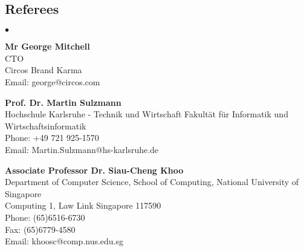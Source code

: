 \documentclass[margin,line]{res}
\newenvironment{list2}{
  \begin{list}{$\bullet$}{%
      \setlength{\itemsep}{0in}
      \setlength{\parsep}{0in} \setlength{\parskip}{0in}
      \setlength{\topsep}{0in} \setlength{\partopsep}{0in} 
      \setlength{\leftmargin}{0.2in}}}{\end{list}}
\newcommand{\ignore}[1]{}
\begin{document}
\begin{resume}
\section{Referees}
\begin{list2}
\item {\bf  Mr George Mitchell} \\
CTO \\
Circos Brand Karma  \\
Email: george@circos.com\\ 
\item {\bf  Prof. Dr. Martin Sulzmann} \\
Hochschule Karlsruhe - Technik und Wirtschaft 
Fakultät für Informatik und Wirtschaftsinformatik  \\
Phone:  +49 721 925-1570  \\
Email: Martin.Sulzmann@hs-karlsruhe.de\\ 
\item {\bf Associate Professor Dr. Siau-Cheng Khoo} \\
Department of Computer Science, School of Computing, National University of Singapore \\
Computing 1, Law Link Singapore 117590 \\
Phone: (65)6516-6730 \\
Fax: (65)6779-4580 \\ 
Email: khoosc@comp.nus.edu.sg\\

\ignore{ 
\item {\bf Mr. Linus Wong} \\
Charter Telecom Pte Ltd, Hong Kong, \\
House 43F, Ping Long Tsuen, Lam Tsuen Taipo \\
Phone: (852)96818219 \\
Email: ong@chartertelecom.com.hk}
\end{list2}


\end{resume}
\end{document}
